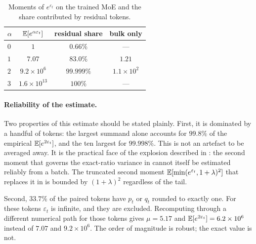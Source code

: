 \begin{table}[t]
\centering
\caption{Moments of $e^{\varepsilon_t}$ on the trained MoE and the share
contributed by residual tokens.}
\label{tab:moments}
\begin{tabular}{lccc}
\toprule
$\alpha$ & $\mathbb{E}[e^{\alpha\varepsilon_t}]$ & residual share & bulk only \\
\midrule
$0$ & $1$                 & $0.66\%$   & --- \\
$1$ & $7.07$              & $83.0\%$   & $1.21$ \\
$2$ & $9.2\times10^{6}$   & $99.999\%$ & $1.1\times10^{2}$ \\
$3$ & $1.6\times10^{13}$  & $100\%$    & --- \\
\bottomrule
\end{tabular}
\end{table}

\paragraph{Reliability of the estimate.}
Two properties of this estimate should be stated plainly. First, it is
dominated by a handful of tokens: the largest summand alone accounts for
$99.8\%$ of the empirical $\mathbb{E}[e^{2\varepsilon_t}]$, and the ten largest for
$99.998\%$. This is not an artefact to be averaged away. It is the practical
face of the explosion described in : the second
moment that governs the exact-ratio variance in  cannot
itself be estimated reliably from a batch. The truncated second moment
$\mathbb{E}[\min(e^{\varepsilon_t},1+\lambda)^2]$ that replaces it in
 is bounded by $(1+\lambda)^2$ regardless of the tail.

Second, $33.7\%$ of the paired tokens have $p_t$ or $q_t$ rounded to exactly
one. For these tokens $\varepsilon_t$ is infinite, and they are excluded.
Recomputing through a different numerical path for those tokens gives
$\mu=5.17$ and $\mathbb{E}[e^{2\varepsilon_t}]=6.2\times10^6$ instead of $7.07$ and
$9.2\times10^6$. The order of magnitude is robust; the exact value is not.

